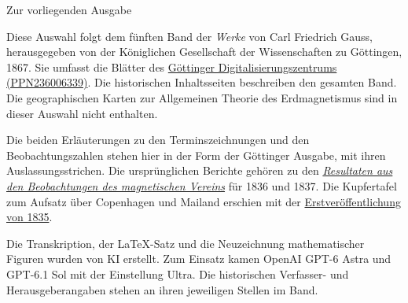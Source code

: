 \clearpage
\thispagestyle{empty}
\vspace*{.7in}
{\Large Zur vorliegenden Ausgabe\par}
\bigskip
Diese Auswahl folgt dem fünften Band der \textit{Werke} von Carl Friedrich Gauss,
herausgegeben von der Königlichen Gesellschaft der Wissenschaften zu Göttingen, 1867.
Sie umfasst die Blätter \GaussVEditionScope{} des
\href{https://gdz.sub.uni-goettingen.de/id/PPN236006339}{Göttinger Digitalisierungszentrums (PPN236006339)}.
Die historischen Inhaltsseiten beschreiben den gesamten Band.
Die geographischen Karten zur Allgemeinen Theorie des Erdmagnetismus
sind in dieser Auswahl nicht enthalten.

\medskip
Die beiden Erläuterungen zu den Terminszeichnungen und den Beobachtungszahlen stehen hier
in der Form der Göttinger Ausgabe, mit ihren Auslassungsstrichen.
Die ursprünglichen Berichte gehören zu den
\href{https://wellcomecollection.org/works/mgyhbnkb}{\textit{Resultaten aus den Beobachtungen des magnetischen Vereins}}
für 1836 und 1837. Die Kupfertafel zum Aufsatz über Copenhagen und Mailand erschien mit
der \href{https://doi.org/10.1002/asna.18350121302}{Erstveröffentlichung von 1835}.

\medskip
Die Transkription, der LaTeX-Satz und die Neuzeichnung mathematischer Figuren
wurden von KI erstellt. Zum Einsatz kamen OpenAI GPT-6 Astra und GPT-6.1 Sol
mit der Einstellung Ultra. Die historischen Verfasser- und Herausgeberangaben
stehen an ihren jeweiligen Stellen im Band.
